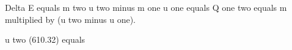 Delta E equals m two u two minus m one u one equals Q one two equals m multiplied by (u two minus u one).  

u two (610.32) equals